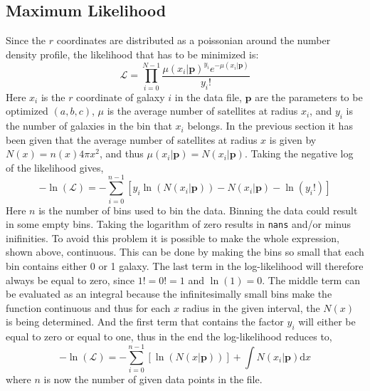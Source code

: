 \subsection{Maximum Likelihood}
Since the $r$ coordinates are distributed as a poissonian around the number density profile, the likelihood that has to be minimized is:
\begin{equation*}
\mathcal{L} = \prod_{i=0}^{N-1} \frac{\mu(x_i|\textbf{p})^{y_i}e^{-\mu(x_i|\textbf{p})}}{y_i!}
\end{equation*}
Here $x_i$ is the $r$ coordinate of galaxy $i$ in the data file, $\textbf{p}$ are the parameters to be optimized $(a,b,c)$, $\mu$ is the average number of satellites at radius $x_i$, and $y_i$ is the number of galaxies in the bin that $x_i$ belongs. In the previous section it has been given that the average number of satellites at radius $x$ is given by $N(x) = n(x)4\pi x^2$, and thus $\mu(x_i|\textbf{p}) = N(x_i|\textbf{p})$.
Taking the negative log of the likelihood gives,
\begin{equation*}
- \ln(\mathcal{L}) = -\sum_{i=0}^{n-1} \left[y_i\ln(N(x_i|\textbf{p})) - N(x_i|\textbf{p}) - \ln(y_i!)\right]
\end{equation*}
Here $n$ is the number of bins used to bin the data.
Binning the data could result in some empty bins. Taking the logarithm of zero results in \texttt{nans} and/or minus inifinities. To avoid this problem it is possible to make the whole expression, shown above, continuous. This can be done by making the bins so small that each bin contains either 0 or 1 galaxy. The last term in the log-likelihood will therefore always be equal to zero, since $1! = 0! = 1$ and $\ln(1) = 0$. The middle term can be evaluated as an integral because the infinitesimally small bins make the function continuous and thus for each $x$ radius in the given interval, the $N(x)$ is being determined. And the first term that contains the factor $y_i$ will either be equal to zero or equal to one, thus in the end the log-likelihood reduces to,
\begin{equation}
-\ln(\mathcal{L}) = -\sum_{i=0}^{n-1} \left[\ln(N(x|\textbf{p}))\right] + \int N(x_i|\textbf{p})\mathrm{d}x
\end{equation}
where $n$ is now the number of given data points in the file.

